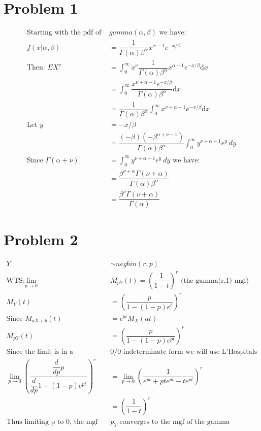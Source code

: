 \documentclass{article}
\newcommand{\dx}{\mathrm{d}x}
\begin{document}
\begin{flushleft}
\section*{Problem 1}
\begin{align*}
\text{Starting with the pdf of } &gamma(\alpha,\beta) \text{ we have:}\\
f(x|\alpha,\beta)&=\dfrac{1}{\Gamma(\alpha)\beta^{\alpha}}x^{\alpha-1}e^{-x/\beta}\\
\text{Then: } EX^{\nu}&=\int_{0}^{\infty}x^{\nu}\dfrac{1}{\Gamma(\alpha)\beta^{\alpha}}x^{\alpha-1}e^{-x/\beta} \dx\\
&=\int_{0}^{\infty}\dfrac{x^{\nu+\alpha-1}e^{-x/\beta} }{\Gamma(\alpha)\beta^{\alpha}}\dx\\
&=\dfrac{1}{\Gamma(\alpha)\beta^{\alpha}}\int_{0}^{\infty}x^{\nu+\alpha-1}e^{-x/\beta} \dx\\
\text{Let } y&=-x/\beta\\
&=\dfrac{(-\beta)(-\beta^{\alpha+\nu-1})}{\Gamma(\alpha)\beta^{\alpha}}\int_{0}^{\infty}y^{\nu+\alpha-1}e^{y} \ dy\\
\text{Since } \Gamma(\alpha+\nu)&=\int_{0}^{\infty}y^{\nu+\alpha-1}e^{y} \ dy \text{ we have:}\\
&=\dfrac{\beta^{\nu+\alpha}\Gamma(\nu+\alpha)}{\Gamma(\alpha)\beta^{\alpha}}\\
&=\dfrac{\beta^{\nu}\Gamma(\nu+\alpha)}{\Gamma(\alpha)}
\end{align*}
\section*{Problem 2}
\begin{align*}
Y&\sim negbin(r,p)\\
\text{WTS:} \lim \limits_{p \to 0}&M_{pY}(t)=\left(\dfrac{1}{1-t}\right)^r \text{ (the gamma(r,1) mgf)}\\
M_Y(t)&=\left(\dfrac{p}{1-(1-p)e^t}\right)^r\\
\text{Since } M_{aX+b}(t)&=e^{bt}M_X(at)\\
M_{pY}(t)&=\left(\dfrac{p}{1-(1-p)e^{pt}}\right)^r\\
\text{Since the limit is in a }& 0/0 \text{ indeterminate form we will use L'Hospitals Rule}\\
\lim \limits_{p \to 0}\left(\dfrac{\dfrac{d}{dp}p}{\dfrac{d}{dp}1-(1-p)e^{pt}}\right)^r&=\lim \limits_{p \to 0}\left(\dfrac{1}{e^{pt}+pte^{pt}-te^{pt}}\right)^r\\
&= \left(\dfrac{1}{1-t}\right)^r\\
\text{Thus limiting p to 0, the mgf of } &p_Y \text{ converges to the mgf of the gamma distribution}
\end{align*}

\end{flushleft}
\end{document}
